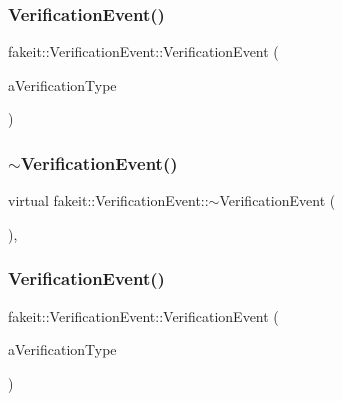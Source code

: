 \subsubsection{\texorpdfstring{VerificationEvent()}{VerificationEvent()}\hspace{0.1cm}{\footnotesize\ttfamily [7/9]}}
{\footnotesize\ttfamily fakeit\+::\+Verification\+Event\+::\+Verification\+Event (\begin{DoxyParamCaption}\item[{\mbox{\hyperlink{namespacefakeit_a9df22520dd60badb149c1d1d2518b253}{Verification\+Type}}}]{a\+Verification\+Type }\end{DoxyParamCaption})\hspace{0.3cm}{\ttfamily [inline]}}

\mbox{\label{structfakeit_1_1VerificationEvent_a5bcca5502a6be4d65db30c1927652a77}} 
\subsubsection{\texorpdfstring{$\sim$VerificationEvent()}{~VerificationEvent()}\hspace{0.1cm}{\footnotesize\ttfamily [7/9]}}
{\footnotesize\ttfamily virtual fakeit\+::\+Verification\+Event\+::$\sim$\+Verification\+Event (\begin{DoxyParamCaption}{ }\end{DoxyParamCaption})\hspace{0.3cm}{\ttfamily [virtual]}, {\ttfamily [default]}}

\mbox{\label{structfakeit_1_1VerificationEvent_afc2366f1ae4d03ec60cc2a2253a79728}} 
\subsubsection{\texorpdfstring{VerificationEvent()}{VerificationEvent()}\hspace{0.1cm}{\footnotesize\ttfamily [8/9]}}
{\footnotesize\ttfamily fakeit\+::\+Verification\+Event\+::\+Verification\+Event (\begin{DoxyParamCaption}\item[{\mbox{\hyperlink{namespacefakeit_a9df22520dd60badb149c1d1d2518b253}{Verification\+Type}}}]{a\+Verification\+Type }\end{DoxyParamCaption})\hspace{0.3cm}{\ttfamily [inline]}}


